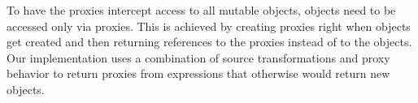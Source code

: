 % 

To have the proxies intercept access to all mutable objects, objects need to be accessed only via proxies.
This is achieved by creating proxies right when objects get created and then returning references to the proxies instead of to the objects.
Our implementation uses a combination of source transformations and proxy behavior to return proxies from expressions that otherwise would return new objects.

